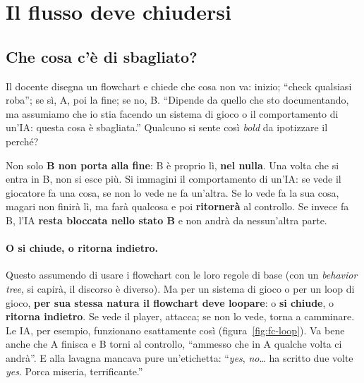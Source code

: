 \section{Il flusso deve chiudersi}
\label{sec:flowchart-loop}

\subsection{Che cosa c'è di sbagliato?}

Il docente disegna un flowchart e chiede che cosa non va: inizio; ``check
qualsiasi roba''; se sì, A, poi la fine; se no, B. ``Dipende da quello che
sto documentando, ma assumiamo che io stia facendo un sistema di gioco o il
comportamento di un'IA: questa cosa è sbagliata.'' Qualcuno si sente così
\emph{bold} da ipotizzare il perché?

Non solo \textbf{B non porta alla fine}: B è proprio lì, \textbf{nel nulla}.
Una volta che si entra in B, non si esce più. Si immagini il comportamento di
un'IA: se vede il giocatore fa una cosa, se non lo vede ne fa un'altra. Se lo
vede fa la sua cosa, magari non finirà lì, ma farà qualcosa e poi
\textbf{ritornerà} al controllo. Se invece fa B, l'IA \textbf{resta bloccata
nello stato B} e non andrà da nessun'altra parte.

\paragraph{O si chiude, o ritorna indietro.} Questo assumendo di usare i
flowchart con le loro regole di base (con un \emph{behavior tree}, si capirà,
il discorso è diverso). Ma per un sistema di gioco o per un loop di gioco,
\textbf{per sua stessa natura il flowchart deve loopare}: o \textbf{si chiude},
o \textbf{ritorna indietro}. Se vede il player, attacca; se non lo vede, torna
a camminare. Le IA, per esempio, funzionano esattamente così
(figura~\ref{fig:fc-loop}). Va bene anche che A finisca e B torni al
controllo, ``ammesso che in A qualche volta ci andrà''. E alla lavagna
mancava pure un'etichetta: ``\emph{yes}, \emph{no}\dots{} ha scritto due volte
\emph{yes}. Porca miseria, terrificante.''

